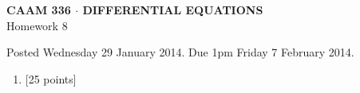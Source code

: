 \documentclass[10pt]{article}
\begin{document}
\vspace*{-5em}
\begin{center}
\large \textsf{\textbf{CAAM 336 $\cdot$ DIFFERENTIAL EQUATIONS}\\[0.5em]
Homework 8 }
\end{center}

Posted Wednesday 29 January 2014.  Due 1pm Friday 7 February 2014.

\begin{enumerate}\addtocounter{enumi}{7}
\item {[25 points]}\\  

\end{enumerate}
\end{document}
